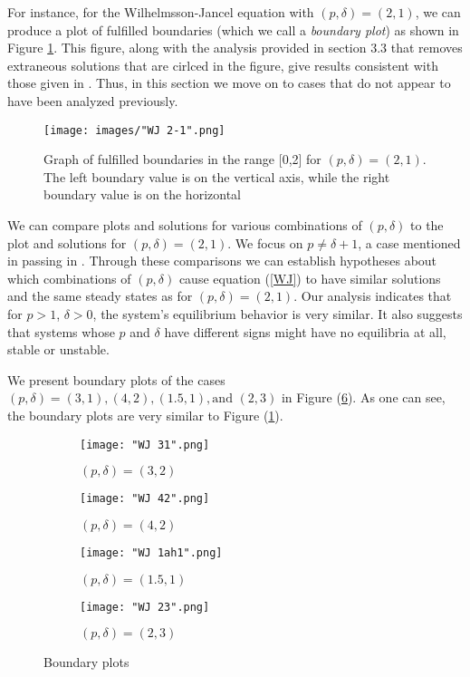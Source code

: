 \documentclass{article}
\begin{document}
For instance, for the Wilhelmsson-Jancel equation with $(p, \delta) = (2,1)$, we can produce a plot of fulfilled boundaries (which we call a \textit{boundary plot}) as shown in Figure \ref{21plot}. This figure, along with the analysis provided in section 3.3 that removes extraneous solutions that are cirlced in the figure, give results consistent with those given in \citep{WJ}. Thus, in this section we move on to cases that do not appear to have been analyzed previously.

\begin{figure}[h]
\begin{center}
\texttt{[image: images/"WJ 2-1".png]}
\caption{Graph of fulfilled boundaries in the range [0,2] for $(p, \delta) = (2,1)$. The left boundary value is on the vertical axis, while the right boundary value is on the horizontal}
\label{21plot}
\end{center}
\end{figure}

We can compare plots and solutions for various combinations of $(p, \delta)$ to the plot and solutions for $(p, \delta) = (2,1)$. We focus on $p \ne \delta + 1$, a case mentioned in passing in \citep{WJ}. Through these comparisons we can establish hypotheses about which combinations of $(p, \delta)$ cause equation (\ref{WJ}) to have similar solutions and the same steady states as for $(p, \delta) = (2,1)$. Our analysis indicates that for $p > 1$, $\delta > 0$, the system's equilibrium behavior is very similar. It also suggests that systems whose $p$ and $\delta$ have different signs might have no equilibria at all, stable or unstable. 

We present boundary plots of the cases $(p, \delta) = (3,1), (4, 2), (1.5, 1), \text{and } (2,3)$ in Figure (\ref{large_positive_plot}). As one can see, the boundary plots are very similar to Figure (\ref{21plot}).

\begin{figure}[h]
\begin{subfigure}{.25\textwidth}
  \centering
  \texttt{[image: "WJ 31".png]}
  \caption{$(p, \delta) = (3,2)$}
  \label{31plot}
\end{subfigure}%
\begin{subfigure}{.25\textwidth}
  \centering
  \texttt{[image: "WJ 42".png]}
  \caption{$(p, \delta) = (4,2)$}
  \label{42plot}
\end{subfigure}%
\begin{subfigure}{.25\textwidth}
  \centering
  \texttt{[image: "WJ 1ah1".png]}
  \caption{$(p, \delta) = (1.5,1)$}
  \label{1ah1plot}
\end{subfigure}%
\begin{subfigure}{.25\textwidth}
  \centering
  \texttt{[image: "WJ 23".png]}
  \caption{$(p, \delta) = (2,3)$}
  \label{23plot}
\end{subfigure}
\caption{Boundary plots}
\label{large_positive_plot}
\end{figure}
\end{document}

